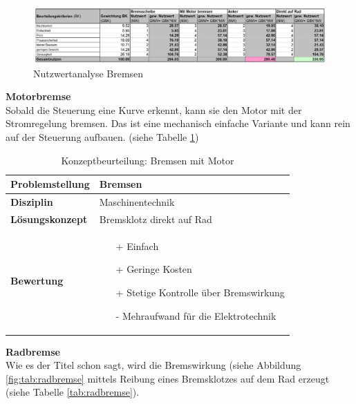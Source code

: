 \documentclass[../../../main.tex]{subfiles}
\begin{document}
    \begin{figure}[H] %
        \centering
        \includegraphics[width=1\textwidth]{Bremsen}
        \caption{Nutzwertanalyse Bremsen}
        \label{fig:bremsen}
    \end{figure}

    \textbf{Motorbremse}\\
    Sobald die Steuerung eine Kurve erkennt, kann sie den Motor mit der Stromregelung bremsen. Das ist eine mechanisch einfache Variante und kann rein auf der Steuerung aufbauen. (siehe Tabelle \ref{tab:motorbremse})

    \begin{flushleft}
        \begin{table}[h]
        \begin{tabular}{ | l | p{11cm} |}
        \hline
        \textbf{Problemstellung} & Bremsen \\ \hline
        \textbf{Disziplin} & Maschinentechnik \\ \hline
        \textbf{Lösungskonzept} & Bremsklotz direkt auf Rad \\ \hline
        \textbf{Bewertung} &  \begin{itemize}
                                \item[+] Einfach
                                \item[+] Geringe Kosten
                                \item[+] Stetige Kontrolle über Bremswirkung 
                                \item[-] Mehraufwand für die Elektrotechnik 
                              \end{itemize} \\ \hline
        \end{tabular}
        \caption{Konzeptbeurteilung: Bremsen mit Motor}
        \label{tab:motorbremse}
    \end{table}
    \end{flushleft}

    \textbf{Radbremse}\\
    Wie es der Titel schon sagt, wird die Bremswirkung (siehe Abbildung \ref{fig:tab:radbremse} mittels Reibung eines Bremsklotzes auf dem Rad erzeugt (siehe Tabelle \ref{tab:radbremse}).
\end{document}
